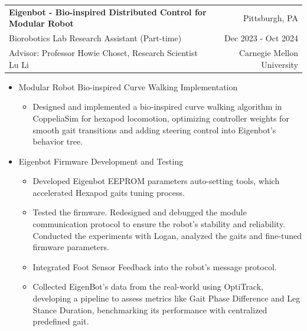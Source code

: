 \documentclass[a4paper,20pt]{article}
\makeatletter
\newcommand{\resumeResearchSubheading}[6]{
  \vspace{5pt}\item
    \begin{tabular*} {0.98\textwidth} {@{\hspace{-0.5em}}l@{\extracolsep{\fill}}r@{}}
      \textbf{#1} & {#2}\null \\
      {#3} & {#4} \\
      {#5} & {#6}
    \end{tabular*}
  \vspace{0pt}
}
\newcommand{\resumeResearchItemListStart}{
  \begin{itemize} [leftmargin=*]
}
\newcommand{\resumeResearchItemListEnd}{
  \end{itemize}
  \vspace{-5pt}
}
\newcommand{\resumeResearchItem}[1]{
  \item{
    {#1 \vspace{-1pt}}
  }
}
\newcommand{\resumeResearchMidItemListStart}{
  \begin{itemize} [leftmargin=*]
}
\newcommand{\resumeResearchMidItemListEnd}{
  \end{itemize}
  \vspace{-5pt}
}
\newcommand{\resumeResearchMidItem}[2]{
  \item{
    \textbf{#1}
    {#2 \vspace{-2pt}}
  }
}
\makeatother
\begin{document}
\resumeResearchSubheading
{Eigenbot - Bio-inspired Distributed Control for Modular Robot} {Pittsburgh, PA}
{Biorobotics Lab Research Assistant (Part-time)} {Dec 2023 - Oct 2024}
{Advisor: Professor Howie Choset, Research Scientist Lu Li} {Carnegie Mellon University}
\resumeResearchMidItemListStart
\resumeResearchMidItem{}
{Modular Robot Bio-inspired Curve Walking Implementation}
{
  \resumeResearchItemListStart
    \resumeResearchItem{}
  {  Designed and implemented a bio-inspired curve walking algorithm in
  CoppeliaSim for hexapod locomotion,
  optimizing controller weights for smooth gait transitions and
  adding steering control into Eigenbot's behavior tree.}

  \resumeResearchItemListEnd
}
\resumeResearchMidItem{}
{Eigenbot Firmware Development and Testing}
{
  \resumeResearchItemListStart
  \resumeResearchItem{}
  {Developed Eigenbot EEPROM parameters auto-setting tools, which accelerated Hexapod gaits tuning process.}
  \resumeResearchItem{}
  {Tested the firmware. Redesigned and debugged the module communication protocol to ensure the robot's stability and reliability. Conducted the experiments with Logan, analyzed the gaits and fine-tuned firmware parameters.}
  \resumeResearchItem{}
  {Integrated Foot Sensor Feedback into the robot's message protocol.}
  \resumeResearchItem{}
  {Collected EigenBot's data from the real-world using OptiTrack, developing a pipeline to assess metrics like Gait Phase Difference and Leg Stance Duration, benchmarking its performance with centralized predefined gait.}
  \resumeResearchItemListEnd
}
\resumeResearchMidItemListEnd

\end{document}
